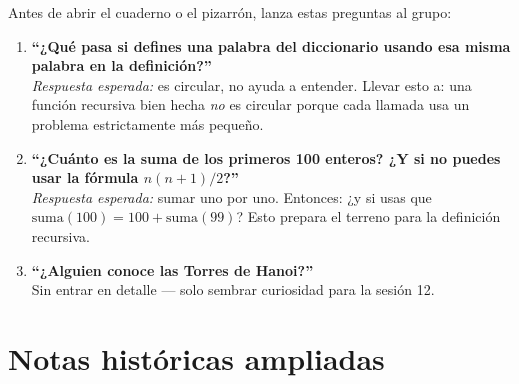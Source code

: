 \documentclass[12pt, oneside]{article}
\begin{document}
\begin{notaprofesor}
  Antes de abrir el cuaderno o el pizarrón, lanza estas preguntas al grupo:

  \begin{enumerate}
    \item \textbf{``¿Qué pasa si defines una palabra del diccionario usando
          esa misma palabra en la definición?''}\\
          \textit{Respuesta esperada:} es circular, no ayuda a entender.
          Llevar esto a: una función recursiva bien hecha \textit{no} es
          circular porque cada llamada usa un problema estrictamente más
          pequeño.

    \item \textbf{``¿Cuánto es la suma de los primeros 100 enteros?
          ¿Y si no puedes usar la fórmula $n(n+1)/2$?''}\\
          \textit{Respuesta esperada:} sumar uno por uno.
          Entonces: ¿y si usas que $\text{suma}(100) = 100 + \text{suma}(99)$?
          Esto prepara el terreno para la definición recursiva.

    \item \textbf{``¿Alguien conoce las Torres de Hanoi?''}\\
          Sin entrar en detalle — solo sembrar curiosidad para la sesión 12.
  \end{enumerate}
\end{notaprofesor}

\section{Notas históricas ampliadas}
\end{document}
